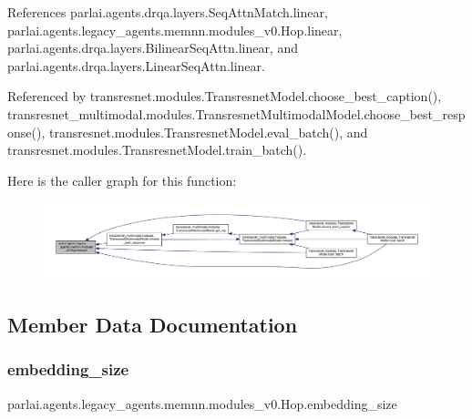 References parlai.\+agents.\+drqa.\+layers.\+Seq\+Attn\+Match.\+linear, parlai.\+agents.\+legacy\+\_\+agents.\+memnn.\+modules\+\_\+v0.\+Hop.\+linear, parlai.\+agents.\+drqa.\+layers.\+Bilinear\+Seq\+Attn.\+linear, and parlai.\+agents.\+drqa.\+layers.\+Linear\+Seq\+Attn.\+linear.



Referenced by transresnet.\+modules.\+Transresnet\+Model.\+choose\+\_\+best\+\_\+caption(), transresnet\+\_\+multimodal.\+modules.\+Transresnet\+Multimodal\+Model.\+choose\+\_\+best\+\_\+response(), transresnet.\+modules.\+Transresnet\+Model.\+eval\+\_\+batch(), and transresnet.\+modules.\+Transresnet\+Model.\+train\+\_\+batch().

Here is the caller graph for this function\+:
\nopagebreak
\begin{figure}[H]
\begin{center}
\leavevmode
\includegraphics[width=350pt]{classparlai_1_1agents_1_1legacy__agents_1_1memnn_1_1modules__v0_1_1Hop_a19e28fabccb536fcc5f0db0e92a7a135_icgraph}
\end{center}
\end{figure}


\subsection{Member Data Documentation}
\mbox{\label{classparlai_1_1agents_1_1legacy__agents_1_1memnn_1_1modules__v0_1_1Hop_ac291a01e4b365714a352d411f353bdc6}} 
\subsubsection{\texorpdfstring{embedding\+\_\+size}{embedding\_size}}
{\footnotesize\ttfamily parlai.\+agents.\+legacy\+\_\+agents.\+memnn.\+modules\+\_\+v0.\+Hop.\+embedding\+\_\+size}




